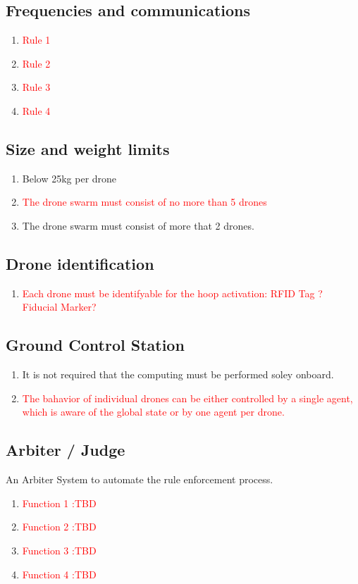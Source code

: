 \subsection{Frequencies and communications}
\begin{enumerate}
	\item{\textcolor{red}{Rule 1}}
	\item{\textcolor{red}{Rule 2}}
	\item{\textcolor{red}{Rule 3}}
	\item{\textcolor{red}{Rule 4}}
\end{enumerate}

\subsection{Size and weight limits}
\begin{enumerate}
	\item{Below 25kg per drone}
	\item{\textcolor{red}{The drone swarm must consist of no more than 5 drones}}
	\item{The drone swarm must consist of more that 2 drones.}
\end{enumerate}

\subsection{Drone identification}
\begin{enumerate}
	\item{\textcolor{red}{Each drone must be identifyable for the hoop activation: RFID Tag ? Fiducial Marker? }}
\end{enumerate}

\subsection{Ground Control Station}
\begin{enumerate}
	\item{It is not required that the computing must be performed soley onboard.}
	\item{\textcolor{red}{The bahavior of individual drones can be either controlled by a single agent, which is aware of the global state or by one agent per drone.}}
\end{enumerate}

\subsection{Arbiter / Judge}
An Arbiter System to automate the rule enforcement process.
\begin{enumerate}

	\item{\textcolor{red}{Function 1 :TBD}}
	\item{\textcolor{red}{Function 2 :TBD}}
	\item{\textcolor{red}{Function 3 :TBD}}
	\item{\textcolor{red}{Function 4 :TBD}}
\end{enumerate}
